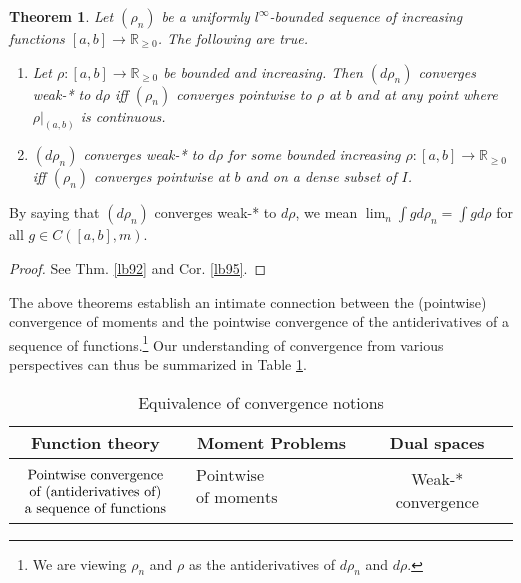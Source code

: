 \documentclass[12pt,b5paper,notitlepage]{article}
\theoremstyle{definition}
\theoremstyle{plain}
\newtheorem{thm}[df]{Theorem}
\newcommand{\Rbb}{\mathbb R}
\numberwithin{equation}{section}
\begin{document}
\begin{thm}\label{lb21}
Let $(\rho_n)$ be a uniformly $l^\infty$-bounded sequence of increasing functions $[a,b]\rightarrow\Rbb_{\geq0}$.  The following are true.
\begin{enumerate}
\item Let $\rho:[a,b]\rightarrow\Rbb_{\geq0}$ be bounded and increasing. Then $(d\rho_n)$ converges weak-* to $d\rho$ iff $(\rho_n)$ converges pointwise to $\rho$ at $b$ and at any point where $\rho|_{(a,b)}$ is continuous.
\item $(d\rho_n)$ converges weak-* to $d\rho$ for some bounded increasing $\rho:[a,b]\rightarrow\Rbb_{\geq0}$ iff $(\rho_n)$ converges pointwise at $b$ and on a dense subset of $I$.
\end{enumerate}
\end{thm}

By saying that $(d\rho_n)$ converges weak-* to $d\rho$, we mean $\lim_n \int gd\rho_n=\int gd\rho$ for all $g\in C([a,b],m)$.

\begin{proof}
See Thm. \ref{lb92} and Cor. \ref{lb95}.
\end{proof}

The above theorems establish an intimate connection between the (pointwise) convergence of moments and the pointwise convergence of the antiderivatives of a sequence of functions.\footnote{We are viewing $\rho_n$ and $\rho$ as the antiderivatives of $d\rho_n$ and $d\rho$.} Our understanding of convergence from various perspectives can thus be summarized in Table \ref{tb1}.

\begin{table}[H]
\centering
 \begin{tabular}{|c|c|c|}
    \hline \rule{0pt}{0.45cm}
Function theory & Moment Problems & Dual spaces\\
\hline 
$\begin{array}{c}
\rule{0pt}{0.45cm}\text{Pointwise convergence} \\
\text{of (antiderivatives of)}\\
\text{a sequence of functions}
\end{array}$
& 
$\begin{array}{c}
\text{Pointwise convergence} \\
\text{of moments}\\
\end{array}$
 & Weak-* convergence\\
\hline
  \end{tabular}
\caption{Equivalence of convergence notions}\label{tb1}
\end{table}
\end{document}
